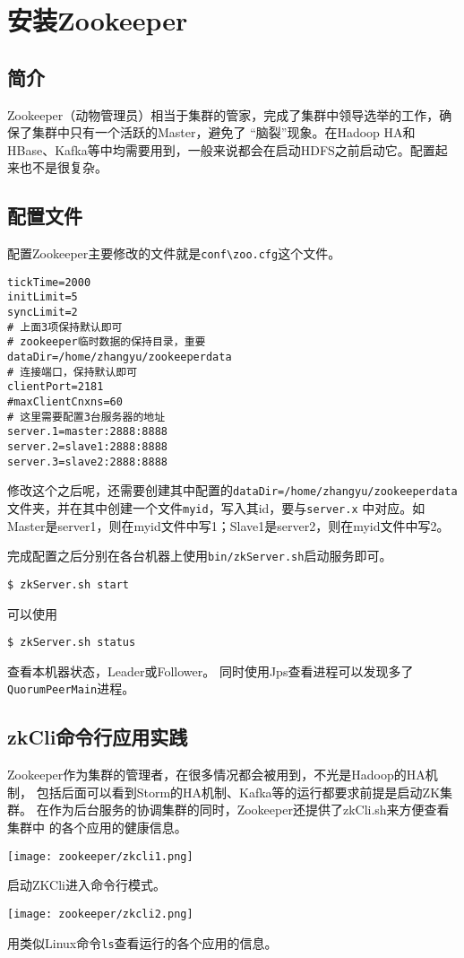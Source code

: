 \section{安装Zookeeper}
\subsection{简介}
Zookeeper（动物管理员）相当于集群的管家，完成了集群中领导选举的工作，确保了集群中只有一个活跃的Master，避免了
“脑裂”现象。在Hadoop HA和HBase、Kafka等中均需要用到，一般来说都会在启动HDFS之前启动它。配置起来也不是很复杂。
\subsection{配置文件}
配置Zookeeper主要修改的文件就是\lstinline{conf\zoo.cfg}这个文件。
\begin{lstlisting}[style=mysh, title=zoo.cfg]
tickTime=2000
initLimit=5
syncLimit=2
# 上面3项保持默认即可
# zookeeper临时数据的保持目录，重要
dataDir=/home/zhangyu/zookeeperdata
# 连接端口，保持默认即可
clientPort=2181
#maxClientCnxns=60
# 这里需要配置3台服务器的地址
server.1=master:2888:8888
server.2=slave1:2888:8888
server.3=slave2:2888:8888
\end{lstlisting}
修改这个之后呢，还需要创建其中配置的\lstinline{dataDir=/home/zhangyu/zookeeperdata}
文件夹，并在其中创建一个文件\lstinline{myid}，写入其id，要与\lstinline{server.x}
中对应。如Master是server1，则在myid文件中写1；Slave1是server2，则在myid文件中写2。

完成配置之后分别在各台机器上使用\lstinline{bin/zkServer.sh}启动服务即可。
\begin{lstlisting}[style=mysh]
$ zkServer.sh start
\end{lstlisting}
可以使用
\begin{lstlisting}[style=mysh]
$ zkServer.sh status
\end{lstlisting}
查看本机器状态，Leader或Follower。
同时使用Jps查看进程可以发现多了\lstinline{QuorumPeerMain}进程。

\subsection{zkCli命令行应用实践}

Zookeeper作为集群的管理者，在很多情况都会被用到，不光是Hadoop的HA机制，
包括后面可以看到Storm的HA机制、Kafka等的运行都要求前提是启动ZK集群。
在作为后台服务的协调集群的同时，Zookeeper还提供了zkCli.sh来方便查看集群中
的各个应用的健康信息。

\begin{center}
    \texttt{[image: zookeeper/zkcli1.png]}

    启动ZKCli进入命令行模式。

    \texttt{[image: zookeeper/zkcli2.png]}

    用类似Linux命令\lstinline{ls}查看运行的各个应用的信息。
\end{center}
